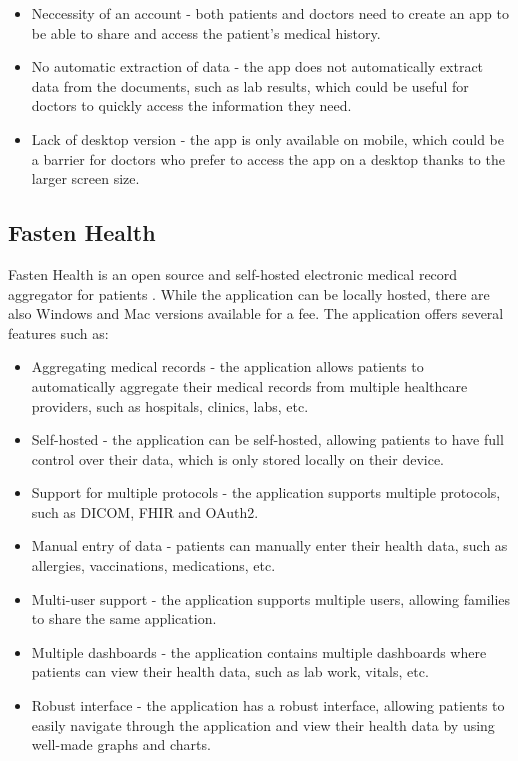 \begin{itemize}
    \item Neccessity of an account - both patients and doctors need to create an app to be able to share and access the patient's medical history.
    \item No automatic extraction of data - the app does not automatically extract data from the documents, such as lab results, which could be useful for doctors to quickly access the information they need.
    \item Lack of desktop version - the app is only available on mobile, which could be a barrier for doctors who prefer to access the app on a desktop thanks to the larger screen size.
\end{itemize}

\subsection{Fasten Health}

Fasten Health is an open source and self-hosted electronic medical record aggregator for patients \parencite{fasten}. While the application can be locally hosted, there are also Windows and Mac versions available for a fee. The application offers several features such as:

\begin{itemize}
    \item Aggregating medical records - the application allows patients to automatically aggregate their medical records from multiple healthcare providers, such as hospitals, clinics, labs, etc.
    \item Self-hosted - the application can be self-hosted, allowing patients to have full control over their data, which is only stored locally on their device.
    \item Support for multiple protocols - the application supports multiple protocols, such as DICOM, FHIR and OAuth2.
    \item Manual entry of data - patients can manually enter their health data, such as allergies, vaccinations, medications, etc.
    \item Multi-user support - the application supports multiple users, allowing families to share the same application.
    \item Multiple dashboards - the application contains multiple dashboards where patients can view their health data, such as lab work, vitals, etc.
    \item Robust interface - the application has a robust interface, allowing patients to easily navigate through the application and view their health data by using well-made graphs and charts.
\end{itemize}

